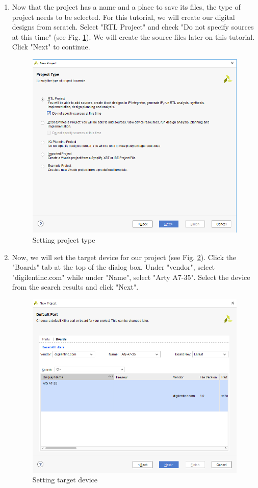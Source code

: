 \documentclass{article}
\begin{document}
\begin{enumerate}
    \item Now that the project has a name and a place to save its files, the type of project needs to be selected. For this tutorial, we will create our 
      digital designs from scratch. Select "RTL Project" and check "Do not specify sources at this time" (see Fig. \ref{fig:3-project_type}). 
      We will create the source files later on this tutorial. Click "Next" to continue.
      \begin{figure}[h!]
        \centering
        \includegraphics[width=0.5\linewidth]{img/program/3-project_type.png}
        \caption{Setting project type}
        \label{fig:3-project_type}
      \end{figure}

    \item Now, we will set the target device for our project (see Fig. \ref{fig:4-default_part}). Click the "Boards" tab at the top of the dialog box. Under "vendor", select "digilentinc.com" while 
      under "Name", select "Arty A7-35". Select the device from the search results and click "Next".
        \begin{figure}[h!]
          \centering
          \includegraphics[width=0.5\linewidth]{img/program/4-default_part.png}
          \caption{Setting target device}
          \label{fig:4-default_part}
        \end{figure}


\end{enumerate}
\end{document}
